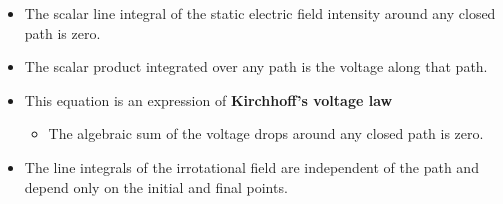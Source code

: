 \begin{ELunit}

\begin{itemize}
\tightlist
\item
  The scalar line integral of the static electric field intensity around any closed path is zero.
\item
  The scalar product  integrated over any path is the voltage along that path.
\item
  This equation is an expression of \textbf{Kirchhoff's voltage law}

  \begin{itemize}
  \tightlist
  \item
    The algebraic sum of the voltage drops around any closed path is zero.
  \end{itemize}
\item
  The line integrals of the irrotational field  are independent of the path and depend only on the initial and final points.
\end{itemize}



\end{ELunit}

\ELhold


